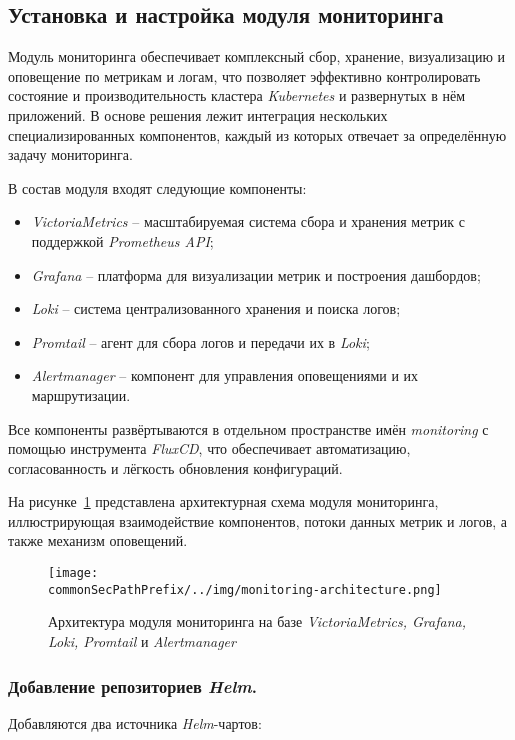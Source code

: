 \subsection{Установка и настройка модуля мониторинга}

Модуль мониторинга обеспечивает комплексный сбор, хранение, визуализацию и оповещение по метрикам и логам, что позволяет эффективно контролировать состояние и производительность кластера \textit{Kubernetes} и развернутых в нём приложений. В основе решения лежит интеграция нескольких специализированных компонентов, каждый из которых отвечает за определённую задачу мониторинга.

В состав модуля входят следующие компоненты:

\begin{itemize}
    \item \textit{VictoriaMetrics}\cite{victoriametrics} -- масштабируемая система сбора и хранения метрик с поддержкой \textit{Prometheus API};
    \item \textit{Grafana} -- платформа для визуализации метрик и построения дашбордов;
    \item \textit{Loki}\cite{loki} -- система централизованного хранения и поиска логов;
    \item \textit{Promtail} -- агент для сбора логов и передачи их в \textit{Loki};
    \item \textit{Alertmanager} -- компонент для управления оповещениями и их маршрутизации.
\end{itemize}

Все компоненты развёртываются в отдельном пространстве имён \textit{monitoring} с помощью инструмента \textit{FluxCD}, что обеспечивает автоматизацию, согласованность и лёгкость обновления конфигураций.

На рисунке~\ref{fig:monitoring-architecture} представлена архитектурная схема модуля мониторинга, иллюстрирующая взаимодействие компонентов, потоки данных метрик и логов, а также механизм оповещений.

\begin{figure}[ht]
    \centering
    \texttt{[image: \\commonSecPathPrefix/../img/monitoring-architecture.png]}
    \caption{Архитектура модуля мониторинга на базе \textit{VictoriaMetrics, Grafana, Loki, Promtail} и \textit{Alertmanager}}
    \label{fig:monitoring-architecture}
\end{figure}

\subsubsection{Добавление репозиториев \textit{Helm}.} Добавляются два источника \textit{Helm}-чартов:

